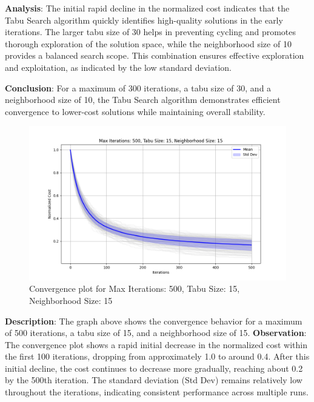 \documentclass[
]{article}
\begin{document}
    \textbf{Analysis}: The initial rapid decline in the normalized cost indicates that the Tabu Search algorithm quickly identifies high-quality solutions in the early iterations. The larger tabu size of 30 helps in preventing cycling and promotes thorough exploration of the solution space, while the neighborhood size of 10 provides a balanced search scope. This combination ensures effective exploration and exploitation, as indicated by the low standard deviation.

    \textbf{Conclusion}: For a maximum of 300 iterations, a tabu size of 30, and a neighborhood size of 10, the Tabu Search algorithm demonstrates efficient convergence to lower-cost solutions while maintaining overall stability.



    \begin{figure}[H]
        \centering
        \includegraphics{tabu_search/max_iter_500_tabu_size_15_neighborhood_size_15}
        \caption{Convergence plot for Max Iterations: 500, Tabu Size: 15, Neighborhood Size: 15}
        \label{fig:ts_500_15_15}
    \end{figure}

    \textbf{Description}: The graph above shows the convergence behavior for a maximum of 500 iterations, a tabu size of 15, and a neighborhood size of 15.
    \textbf{Observation}: The convergence plot shows a rapid initial decrease in the normalized cost within the first 100 iterations, dropping from approximately 1.0 to around 0.4. After this initial decline, the cost continues to decrease more gradually, reaching about 0.2 by the 500th iteration. The standard deviation (Std Dev) remains relatively low throughout the iterations, indicating consistent performance across multiple runs.
\end{document}
